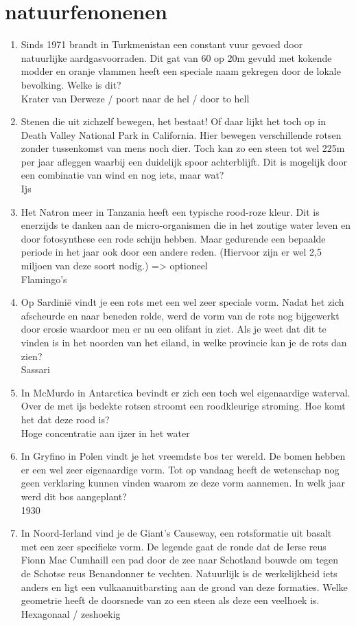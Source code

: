 \section{natuurfenonenen}
\begin{enumerate}
\item{Sinds 1971 brandt in Turkmenistan een constant vuur gevoed door natuurlijke aardgasvoorraden. Dit gat van 60 op 20m gevuld met kokende modder en oranje vlammen heeft een speciale naam gekregen door de lokale bevolking. Welke is dit?\\ Krater van Derweze / poort naar de hel / door to hell
}
\item{Stenen die uit zichzelf bewegen, het bestaat! Of daar lijkt het toch op in Death Valley National Park in California. Hier bewegen verschillende rotsen zonder tussenkomst van mens noch dier. Toch kan zo een steen tot wel 225m per jaar afleggen waarbij een duidelijk spoor achterblijft. Dit is mogelijk door een combinatie van wind en nog iets, maar wat? \\ Ijs}
\item{Het Natron meer in Tanzania heeft een typische rood-roze kleur. Dit is enerzijds te danken aan de micro-organismen die in het zoutige water leven en door fotosynthese een rode schijn hebben. Maar gedurende een bepaalde periode in het jaar ook door een andere reden. 
(Hiervoor zijn er wel 2,5 miljoen van deze soort nodig.) => optioneel\\ Flamingo’s}
\item{Op Sardinië vindt je een rots met een wel zeer speciale vorm. Nadat het zich afscheurde en naar beneden rolde, werd de vorm van de rots nog bijgewerkt door erosie waardoor men er nu een olifant in ziet. Als je weet dat dit te vinden is in het noorden van het eiland, in welke provincie kan je de rots dan zien?\\ Sassari}
\item{In McMurdo in Antarctica bevindt er zich een toch wel eigenaardige waterval. Over de met ijs bedekte rotsen stroomt een roodkleurige stroming. Hoe komt het dat deze rood is?\\ Hoge concentratie aan ijzer in het water
}
\item{In Gryfino in Polen vindt je het vreemdste bos ter wereld. De bomen hebben er een wel zeer eigenaardige vorm. Tot op vandaag heeft de wetenschap nog geen verklaring kunnen vinden waarom ze deze vorm aannemen. In welk jaar werd dit bos aangeplant? \\ 1930}
\item{In Noord-Ierland vind je de Giant’s Causeway, een rotsformatie uit basalt met een zeer specifieke vorm. De legende gaat de ronde dat de Ierse reus Fionn Mac Cumhaill een pad door de zee naar Schotland bouwde om tegen de Schotse reus Benandonner te vechten. Natuurlijk is de werkelijkheid iets anders en ligt een vulkaanuitbarsting aan de grond van deze formaties. Welke geometrie heeft de doorsnede van zo een steen als deze een veelhoek is.\\ Hexagonaal / zeshoekig}

\end{enumerate}
